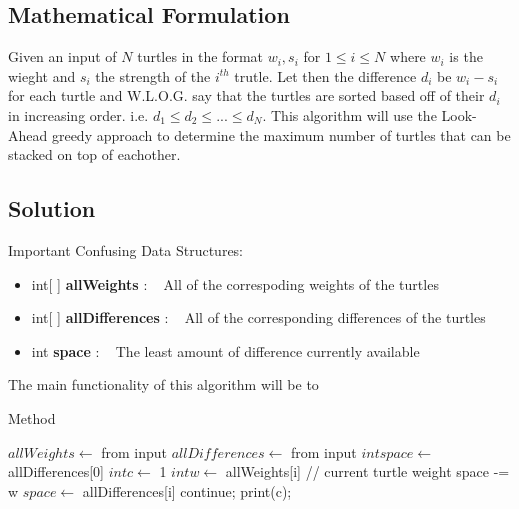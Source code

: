 \documentclass[12pt]{article}
\begin{document}
\newpage

\subsection{Mathematical Formulation}
Given an input of $N$ turtles in the format $w_i, s_i$ for $1\leq i \leq N$ where
$w_i$ is the wieght and $s_i$ the strength of the $i^{th}$ trutle. Let then the
difference $d_i$ be $w_i - s_i$ for each turtle and W.L.O.G. say that the turtles
are sorted based off of their $d_i$ in increasing order. i.e. $d_1 \leq d_2 \leq ... \leq d_N$.
This algorithm will use the Look-Ahead greedy approach to determine the maximum number of turtles
that can be stacked on top of eachother.


\subsection{Solution}
Important Confusing Data Structures:
\begin{itemize}
    \item int[ ] \textbf{allWeights} : ~ All of the correspoding weights of the turtles
    \item int[ ] \textbf{allDifferences} : ~ All of the corresponding differences of the turtles
    \item int \textbf{space} : ~ The least amount of difference currently available
\end{itemize}

The main functionality of this algorithm will be to

\begin{algorithm}[H]
\caption{ Method}
\begin{algorithmic}
        \State $allWeights \gets$ from input
        \State $allDifferences \gets$ from input
        \State $int space \gets$ allDifferences[0]
        \State $int c \gets$ 1
            \State $int w \gets$ allWeights[i] // current turtle weight
                    \State space -= w
                \Else
                    \State $space \gets$ allDifferences[i]
                \EndIf
            \Else
                \State continue;
            \EndIf
        \EndFor
        \State print(c);
    \EndProcedure
\end{algorithmic}
\end{algorithm}
\end{document}
